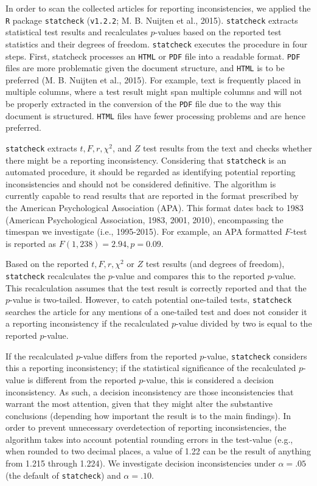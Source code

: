 \documentclass[english,floatsintext,man]{apa6}
\begin{document}
In order to scan the collected articles for reporting inconsistencies,
we applied the \texttt{R} package \texttt{statcheck} (\texttt{v1.2.2};
M. B. Nuijten et al., 2015). \texttt{statcheck} extracts statistical
test results and recalculates \(p\)-values based on the reported test
statistics and their degrees of freedom. \texttt{statcheck} executes the
procedure in four steps. First, statcheck processes an \texttt{HTML} or
\texttt{PDF} file into a readable format. \texttt{PDF} files are more
problematic given the document structure, and \texttt{HTML} is to be
preferred (M. B. Nuijten et al., 2015). For example, text is frequently
placed in multiple columns, where a test result might span multiple
columns and will not be properly extracted in the conversion of the
\texttt{PDF} file due to the way this document is structured.
\texttt{HTML} files have fewer processing problems and are hence
preferred.

\texttt{statcheck} extracts \(t,F,r,\chi^2\), and \(Z\) test results
from the text and checks whether there might be a reporting
inconsistency. Considering that \texttt{statcheck} is an automated
procedure, it should be regarded as identifying potential reporting
inconsistencies and should not be considered definitive. The algorithm
is currently capable to read results that are reported in the format
prescribed by the American Psychological Association (APA). This format
dates back to 1983 (American Psychological Association, 1983, 2001,
2010), encompassing the timespan we investigate (i.e., 1995-2015). For
example, an APA formatted \(F\)-test is reported as
\(F(1, 238)=2.94,p=0.09\).

Based on the reported \(t,F,r,\chi^2\) or \(Z\) test results (and
degrees of freedom), \texttt{statcheck} recalculates the \(p\)-value and
compares this to the reported \(p\)-value. This recalculation assumes
that the test result is correctly reported and that the \(p\)-value is
two-tailed. However, to catch potential one-tailed tests,
\texttt{statcheck} searches the article for any mentions of a one-tailed
test and does not consider it a reporting inconsistency if the
recalculated \(p\)-value divided by two is equal to the reported
\(p\)-value.

If the recalculated \(p\)-value differs from the reported \(p\)-value,
\texttt{statcheck} considers this a reporting inconsistency; if the
statistical significance of the recalculated \(p\)-value is different
from the reported \(p\)-value, this is considered a decision
inconsistency. As such, a decision inconsistency are those
inconsistencies that warrant the most attention, given that they might
alter the substantive conclusions (depending how important the result is
to the main findings). In order to prevent unnecessary overdetection of
reporting inconsistencies, the algorithm takes into account potential
rounding errors in the test-value (e.g., when rounded to two decimal
places, a value of 1.22 can be the result of anything from 1.215 through
1.224). We investigate decision inconsistencies under \(\alpha=.05\)
(the default of \texttt{statcheck}) and \(\alpha=.10\).
\end{document}

